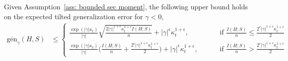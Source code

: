 \documentclass[10pt,a4paper]{amsart}
\begin{document}
\begin{proposition}\label{prop: expected bound V2 unbound}
 Given Assumption~\ref{ass: bounded sec moment}, the following upper bound holds on the expected tilted generalization error for $\gamma<0$,
        \begin{equation} \nonumber 
        \begin{split}
       \overline{\mathrm{gen}}_{\gamma}(H,S)&\leq \begin{cases}
              \frac{\exp(|\gamma| \kappa_t) }{|\gamma|}\sqrt{\frac{2|\gamma|^{1+\epsilon} \kappa_t^{1+\epsilon} I(H;S)}{n}}+|\gamma|^\epsilon\kappa_t^{1+\epsilon},\qquad & \mbox{ if }\frac{I(H;S)}{n}\leq \frac{2^{\epsilon}|\gamma|^{1+\epsilon} \kappa_t^{1+\epsilon}}{2}\\
              \frac{  \exp(|\gamma| \kappa_t)}{ |\gamma|} \Big(\frac{ I(H;S)}{n}+\frac{2^{\epsilon}|\gamma|^{1+\epsilon} \kappa_t^{1+\epsilon}}{2}\Big)+ |\gamma|^\epsilon\kappa_t^{1+\epsilon},\qquad & \mbox{ if } \frac{I(H;S)}{n}>\frac{2^{\epsilon}|\gamma|^{1+\epsilon} \kappa_t^{1+\epsilon}}{2}
          \end{cases}
       \end{split}
    \end{equation}
\end{proposition}
\end{document}
